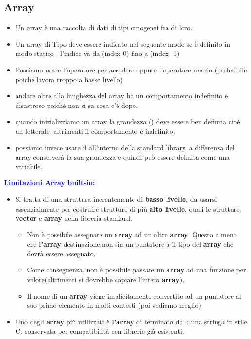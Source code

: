  \subsection{Array}
 \begin{itemize}
    \item Un array è una raccolta di dati di tipi omogenei fra di loro.
    \item Un array di Tipo \textcolor{blue}{\textbf{}} deve essere indicato nel seguente modo se è definito in modo statico \textcolor{blue}{\textbf{}}.
    l'indice va da  (index 0) fino a (index -1)
     
    \item Possiamo usare l'operatore \textcolor{blue}{\code{[]}} per accedere oppure l'operatore unario \textcolor{blue}{\code{*}} (preferibile \textcolor{blue}{\code{[]}} poiché \textcolor{blue}{\code{*}} lavora troppo a basso livello)
    \item andare oltre alla lunghezza del array ha un comportamento indefinito e disastroso poiché non si sa cosa c'è dopo.
    \item quando inizializziamo un array la grandezza (\textcolor{blue}{}) deve essere ben definita cioè un letterale. altrimenti il comportamento è indefinito. 
    \item possiamo invece usare il \textbf{\textcolor{blue}{}} all'interno della standard library. a differenza del array conserverà la sua grandezza e quindi può essere definita come una variabile.
    
 \end{itemize}
\textbf{\textcolor{blue}{Limitazioni Array built-in:}}
\begin{itemize}
    \item Si tratta di una struttura inerentemente di \textbf{basso livello}, da usarsi essenzialmente per costruire strutture di più \textbf{alto
    livello}, quali le strutture \textbf{vector} e \textbf{array} della libreria standard.
    \begin{itemize}
        \item  Non è possibile assegnare un \textbf{array} ad un altro \textbf{array}. Questo a meno che \textbf{l'array} destinazione non sia un puntatore a il tipo del \textbf{array} che dovrà essere assegnato.
        
        \item  Come conseguenza, non è possibile passare un \textbf{array} ad
        una funzione per valore(altrimenti  si dovrebbe copiare l'intero \textbf{array}).
        \item  Il nome di un \textbf{array} viene implicitamente convertito ad un puntatore al suo primo elemento in molti contesti (poi
        vediamo meglio)
    \end{itemize}
    
    \item  Uno degli \textbf{array} più utilizzati è \textbf{l’array} di  terminato dal : una stringa in stile C: conservata per compatibilità con librerie già esistenti.

\end{itemize}


